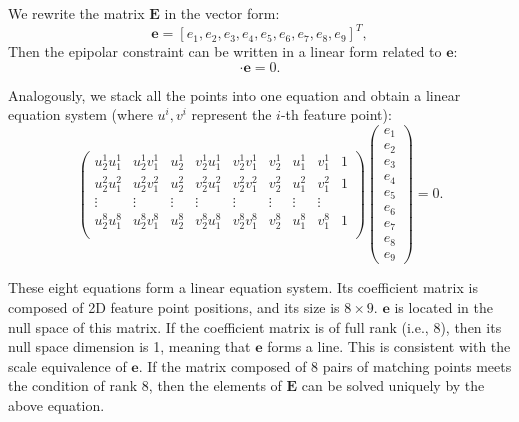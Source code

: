 We rewrite the matrix $\mathbf{E}$ in the vector form:
\[
\mathbf{e}= [e_{1},e_{2},e_{3},e_{4},e_{5},e_{6},e_{7},e_{8},e_{9}]^T,
\]
Then the epipolar constraint can be written in a linear form related to $\mathbf{e}$:
\begin{equation}
[u_{2}u_{1},u_{2}v_{1},u_{2},v_{2}u_{1},v_{2}v_{1},v_{2},u_{1},v_{1},1] \cdot  \mathbf{e}=0.
\end{equation}

Analogously, we stack all the points into one equation and obtain a linear equation system (where $u^i, v^i$ represent the $i$-th feature point): 
\begin{equation}
\label{Eq:eight-point}
\begin{pmatrix}
u_{2}^{1}u_{1}^{1}& u_{2}^{1}v_{1}^{1}& u_{2}^{1}& v_{2}^{1}u_{1}^{1}& v_{2}^{1}v_{1}^{1}& v_{2}^{1} &u_{1}^{1} &v_{1}^{1}&1\\
u_{2}^{2}u_{1}^{2}& u_{2}^{2}v_{1}^{2}& u_{2}^{2}& v_{2}^{2}u_{1}^{2}& v_{2}^{2}v_{1}^{2}& v_{2}^{2} &u_{1}^{2} &v_{1}^{2}&1\\
\vdots & \vdots & \vdots & \vdots & \vdots & \vdots & \vdots & \vdots \\
u_{2}^{8}u_{1}^{8}& u_{2}^{8}v_{1}^{8}& u_{2}^{8}& v_{2}^{8}u_{1}^{8}& v_{2}^{8}v_{1}^{8}& v_{2}^{8} &u_{1}^{8}&v_{1}^{8}&1\\
\end{pmatrix}
\begin{pmatrix}
e_{1}\\ e_{2}\\ e_{3}\\  e_{4}\\ e_{5}\\ e_{6}\\ e_{7}\\ e_{8}\\ e_{9}  
\end{pmatrix}
=0.
\end{equation}


These eight equations form a linear equation system. Its coefficient matrix is composed of 2D feature point positions, and its size is $8 \times 9$. $\mathbf{e}$ is located in the null space of this matrix. If the coefficient matrix is of full rank (i.e., 8), then its null space dimension is 1, meaning that $\mathbf{e}$ forms a line. This is consistent with the scale equivalence of $\mathbf{e}$. If the matrix composed of 8 pairs of matching points meets the condition of rank 8, then the elements of $\mathbf{E}$ can be solved uniquely by the above equation.

